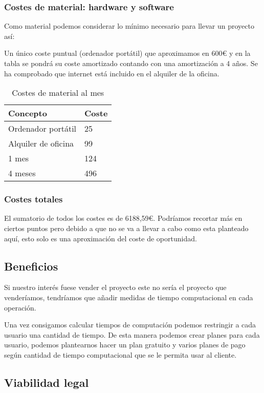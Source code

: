 \subsubsection{Costes de material: hardware y software}

Como material podemos considerar lo mínimo necesario para llevar un proyecto así:

Un único coste puntual (ordenador portátil) que aproximamos en 600€ y en la tabla se pondrá su coste amortizado contando con una amortización a 4 años. Se ha comprobado que internet está incluido en el alquiler de la oficina.

\begin{table}[]
\centering
\caption{Costes de material al mes}
\label{Costes mensualmente}
\begin{tabular}{@{}ll@{}}
\toprule
Concepto & Coste \\ \midrule
Ordenador portátil & 25 \\
Alquiler de oficina & 99 \\
1 mes & 124 \\ \midrule
4 meses  & 496 \\ \bottomrule
\end{tabular}
\end{table}


\subsubsection{Costes totales}
El sumatorio de todos los costes es de 6188,59€. Podríamos recortar más en ciertos puntos pero debido a que no se va a llevar a cabo como esta planteado aquí, esto solo es una aproximación del coste de oportunidad.




\subsection{Beneficios}
Si nuestro interés fuese vender el proyecto este no sería el proyecto que venderíamos, tendríamos que añadir medidas de tiempo computacional en cada operación.

Una vez consigamos calcular tiempos de computación podemos restringir a cada usuario una cantidad de tiempo. De esta manera podemos crear planes para cada usuario, podemos plantearnos hacer un plan gratuito y varios planes de pago según cantidad de tiempo computacional que se le permita usar al cliente. 


\subsection{Viabilidad legal}

